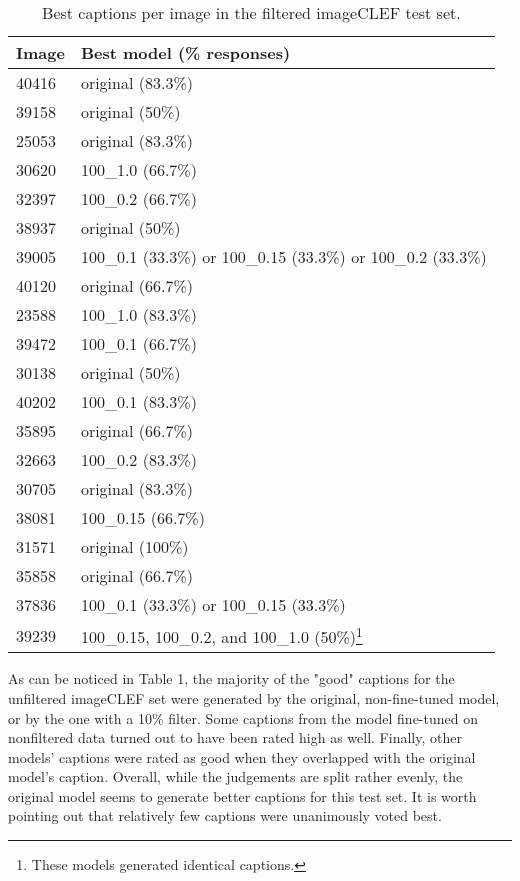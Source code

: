 \documentclass[11pt]{article}
\begin{document}
\begin{table}[h]
\begin{center}
\begin{tabular}{|p{1cm}|p{4.5cm}|}
\hline \bf Image & \bf Best model (\% responses) \\ \hline
40416 & original (83.3\%)  \\
39158 & original (50\%)  \\
25053 & original (83.3\%)  \\
30620 & 100\_1.0 (66.7\%)  \\
32397 & 100\_0.2 (66.7\%) \\
38937 & original (50\%) \\
39005 & 100\_0.1 (33.3\%) or 100\_0.15 (33.3\%) or 100\_0.2 (33.3\%) \\
40120 & original (66.7\%) \\
23588 & 100\_1.0 (83.3\%)  \\
39472 & 100\_0.1 (66.7\%)  \\
30138 & original (50\%)  \\
40202 & 100\_0.1 (83.3\%)  \\
35895 & original (66.7\%)  \\
32663 & 100\_0.2 (83.3\%)   \\
30705 & original (83.3\%) \\
38081 & 100\_0.15 (66.7\%) \\
31571 & original (100\%) \\
35858 & original (66.7\%) \\
37836 & 100\_0.1 (33.3\%) or 100\_0.15 (33.3\%) \\
39239 & 100\_0.15, 100\_0.2, and 100\_1.0 (50\%)\footnote{These models generated identical captions.} \\
\hline
\end{tabular}
\end{center}
\caption{\label{filtered-table} Best captions per image in the filtered imageCLEF test set. }
\end{table}

As can be noticed in Table 1, the majority of the "good" captions for the unfiltered imageCLEF set were generated by the original, non-fine-tuned model, or by the one with a 10\% filter. Some captions from the model fine-tuned on nonfiltered data turned out to have been rated high as well. Finally, other models' captions were rated as good when they overlapped with the original model's caption. Overall, while the judgements are split rather evenly, the original model seems to generate better captions for this test set. It is worth pointing out that relatively few captions were unanimously voted best. 
\end{document}

